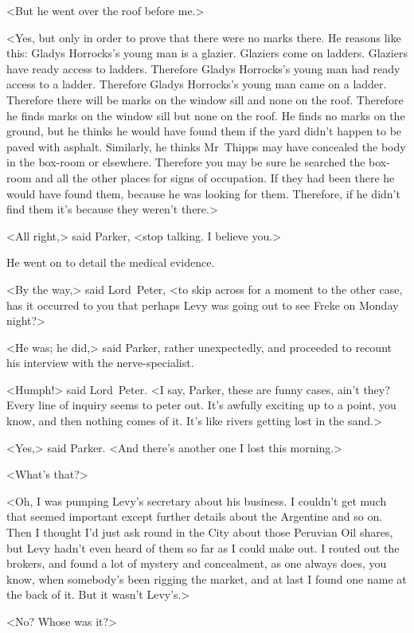 <But he went over the roof before me.>

<Yes, but only in order to prove that there were no marks there. He reasons like this: Gladys Horrocks's young man is a glazier. Glaziers come on ladders. Glaziers have ready access to ladders. Therefore Gladys Horrocks's young man had ready access to a ladder. Therefore Gladys Horrocks's young man came on a ladder. Therefore there will be marks on the window sill and none on the roof. Therefore he finds marks on the window sill but none on the roof. He finds no marks on the ground, but he thinks he would have found them if the yard didn't happen to be paved with asphalt. Similarly, he thinks Mr~Thipps may have concealed the body in the box-room or elsewhere. Therefore you may be sure he searched the box-room and all the other places for signs of occupation. If they had been there he would have found them, because he was looking for them. Therefore, if he didn't find them it's because they weren't there.>

<All right,> said Parker, <stop talking. I believe you.>

He went on to detail the medical evidence.

<By the way,> said Lord~Peter, <to skip across for a moment to the other case, has it occurred to you that perhaps Levy was going out to see Freke on Monday night?>

<He was; he did,> said Parker, rather unexpectedly, and proceeded to recount his interview with the nerve-specialist.

<Humph!> said Lord~Peter. <I say, Parker, these are funny cases, ain't they? Every line of inquiry seems to peter out. It's awfully exciting up to a point, you know, and then nothing comes of it. It's like rivers getting lost in the sand.>

<Yes,> said Parker. <And there's another one I lost this morning.>

<What's that?>

<Oh, I was pumping Levy's secretary about his business. I couldn't get much that seemed important except further details about the Argentine and so on. Then I thought I'd just ask round in the City about those Peruvian Oil shares, but Levy hadn't even heard of them so far as I could make out. I routed out the brokers, and found a lot of mystery and concealment, as one always does, you know, when somebody's been rigging the market, and at last I found one name at the back of it. But it wasn't Levy's.>

<No? Whose was it?>

